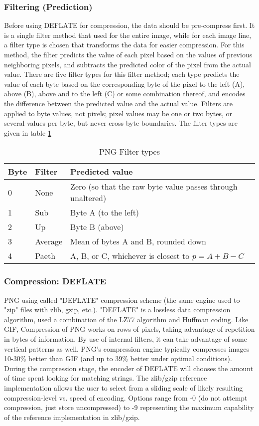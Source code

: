 \subsubsection{Filtering (Prediction)}
Before using DEFLATE for compression, the data should be pre-compress first. It is a single filter method that used for the entire image, while for each image line, a filter type is chosen that transforms the data for easier compression. For this method, the filter predicts the value of each pixel based on the values of previous neighboring pixels, and subtracts the predicted color of the pixel from the actual value. There are five filter types for this filter method; each type predicts the value of each byte based on the corresponding byte of the pixel to the left (A), above (B), above and to the left (C) or some combination thereof, and encodes the difference between the predicted value and the actual value. Filters are applied to byte values, not pixels; pixel values may be one or two bytes, or several values per byte, but never cross byte boundaries. The filter types are given in table \ref{tab:filtertypes}

\begin{table}
\begin{tabular}{|l|l|p{10em}|}\hline
Byte		& Filter	& Predicted value \\\hline
0		& None	 	& Zero (so that the raw byte value passes through unaltered) \\\hline
1		& Sub		& Byte A (to the left) \\\hline
2		& Up		& Byte B (above) \\\hline
3		& Average	& Mean of bytes A and B, rounded down \\\hline
4		& Paeth		& A, B, or C, whichever is closest to $p = A + B - C$ \\\hline
\end{tabular}
\caption{PNG Filter types}
\label{tab:filtertypes}
\end{table}

\subsubsection{Compression: DEFLATE}
PNG using called "DEFLATE" compression scheme (the same engine used to "zip" files with zlib, gzip, etc.).  "DEFLATE" is a lossless data compression algorithm, used a combination of the LZ77 algorithm and Huffman coding. Like GIF, Compression of PNG works on rows of pixels, taking advantage of repetition in bytes of information. By use of internal filters, it can take advantage of some vertical patterns as well. PNG's compression engine typically compresses images 10-30\% better than GIF (and up to 39\% better under optimal conditions). During the compression stage, the encoder of DEFLATE will chooses the amount of time spent looking for matching strings. The zlib/gzip reference implementation allows the user to select from a sliding scale of likely resulting compression-level vs. speed of encoding. Options range from -0 (do not attempt compression, just store uncompressed) to -9 representing the maximum capability of the reference implementation in zlib/gzip.
 
